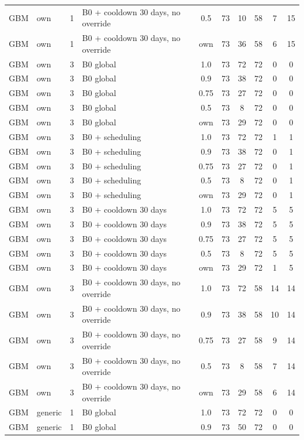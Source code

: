 \begin{longtable}{lllp{4.4cm}cccccc}
GBM & own & 1 & B0 + cooldown 30 days, no override & 0.5 & 73 & 10 & 58 & 7 & 15 \\
GBM & own & 1 & B0 + cooldown 30 days, no override & own & 73 & 36 & 58 & 6 & 15 \\
GBM & own & 3 & B0 global & 1.0 & 73 & 72 & 72 & 0 & 0 \\
GBM & own & 3 & B0 global & 0.9 & 73 & 38 & 72 & 0 & 0 \\
GBM & own & 3 & B0 global & 0.75 & 73 & 27 & 72 & 0 & 0 \\
GBM & own & 3 & B0 global & 0.5 & 73 & 8 & 72 & 0 & 0 \\
GBM & own & 3 & B0 global & own & 73 & 29 & 72 & 0 & 0 \\
GBM & own & 3 & B0 + scheduling & 1.0 & 73 & 72 & 72 & 1 & 1 \\
GBM & own & 3 & B0 + scheduling & 0.9 & 73 & 38 & 72 & 0 & 1 \\
GBM & own & 3 & B0 + scheduling & 0.75 & 73 & 27 & 72 & 0 & 1 \\
GBM & own & 3 & B0 + scheduling & 0.5 & 73 & 8 & 72 & 0 & 1 \\
GBM & own & 3 & B0 + scheduling & own & 73 & 29 & 72 & 0 & 1 \\
GBM & own & 3 & B0 + cooldown 30 days & 1.0 & 73 & 72 & 72 & 5 & 5 \\
GBM & own & 3 & B0 + cooldown 30 days & 0.9 & 73 & 38 & 72 & 5 & 5 \\
GBM & own & 3 & B0 + cooldown 30 days & 0.75 & 73 & 27 & 72 & 5 & 5 \\
GBM & own & 3 & B0 + cooldown 30 days & 0.5 & 73 & 8 & 72 & 5 & 5 \\
GBM & own & 3 & B0 + cooldown 30 days & own & 73 & 29 & 72 & 1 & 5 \\
GBM & own & 3 & B0 + cooldown 30 days, no override & 1.0 & 73 & 72 & 58 & 14 & 14 \\
GBM & own & 3 & B0 + cooldown 30 days, no override & 0.9 & 73 & 38 & 58 & 10 & 14 \\
GBM & own & 3 & B0 + cooldown 30 days, no override & 0.75 & 73 & 27 & 58 & 9 & 14 \\
GBM & own & 3 & B0 + cooldown 30 days, no override & 0.5 & 73 & 8 & 58 & 7 & 14 \\
GBM & own & 3 & B0 + cooldown 30 days, no override & own & 73 & 29 & 58 & 6 & 14 \\
GBM & generic & 1 & B0 global & 1.0 & 73 & 72 & 72 & 0 & 0 \\
GBM & generic & 1 & B0 global & 0.9 & 73 & 50 & 72 & 0 & 0 \\

\end{longtable}
